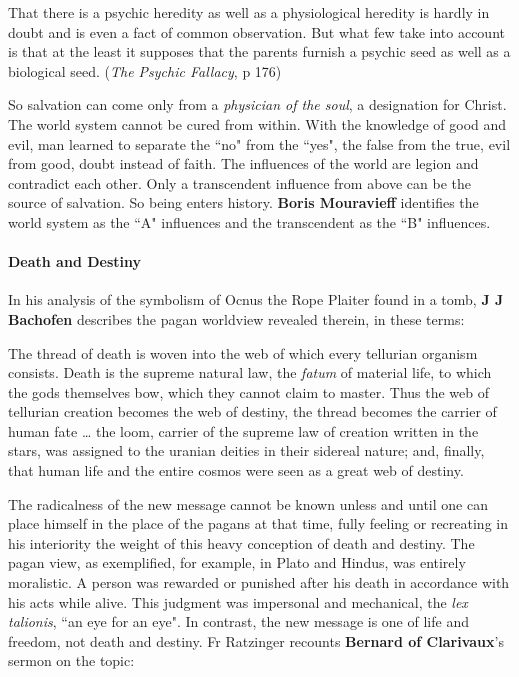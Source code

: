 \begin{quotex}
That there is a psychic heredity as well as a physiological heredity is hardly in doubt and is even a fact of common observation. But what few take into account is that at the least it supposes that the parents furnish a psychic seed as well as a biological seed. (\emph{The Psychic Fallacy}, p 176) 

\end{quotex}
So salvation can come only from a \emph{physician of the soul}, a designation for Christ. The world system cannot be cured from within. With the knowledge of good and evil, man learned to separate the ``no" from the ``yes", the false from the true, evil from good, doubt instead of faith. The influences of the world are legion and contradict each other. Only a transcendent influence from above can be the source of salvation. So being enters history. \textbf{Boris Mouravieff} identifies the world system as the ``A" influences and the transcendent as the ``B" influences.

\paragraph{Death and Destiny}
In his analysis of the symbolism of Ocnus the Rope Plaiter found in a tomb, \textbf{J J Bachofen} describes the pagan worldview revealed therein, in these terms:

\begin{quotex}
The thread of death is woven into the web of which every tellurian organism consists. Death is the supreme natural law, the \emph{fatum} of material life, to which the gods themselves bow, which they cannot claim to master. Thus the web of tellurian creation becomes the web of destiny, the thread becomes the carrier of human fate … the loom, carrier of the supreme law of creation written in the stars, was assigned to the uranian deities in their sidereal nature; and, finally, that human life and the entire cosmos were seen as a great web of destiny. 

\end{quotex}
The radicalness of the new message cannot be known unless and until one can place himself in the place of the pagans at that time, fully feeling or recreating in his interiority the weight of this heavy conception of death and destiny. The pagan view, as exemplified, for example, in Plato and Hindus, was entirely moralistic. A person was rewarded or punished after his death in accordance with his acts while alive. This judgment was impersonal and mechanical, the \emph{lex talionis}, ``an eye for an eye". In contrast, the new message is one of life and freedom, not death and destiny. Fr Ratzinger recounts \textbf{Bernard of Clarivaux}'s sermon on the topic:

